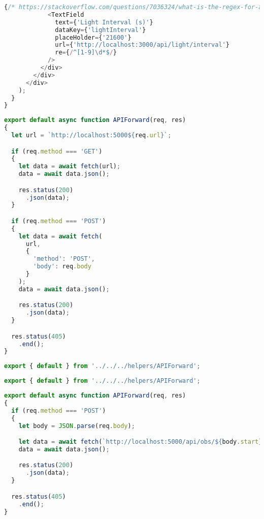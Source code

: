 \begin{lstlisting}[title={index.js}, language=JavaScript]
            {/* https://stackoverflow.com/questions/7036324/what-is-the-regex-for-any-positive-integer-excluding-0 */}
            <TextField
              text={'Light Interval (s)'}
              dataKey={'lightInterval'}
              placeHolder={'21600'}
              url={'http://localhost:3000/api/light/interval'}
              re={/^[1-9]\d*$/}
            />
          </div>
        </div>
      </div>
    );
  }
}
\end{lstlisting}

\bigskip

\begin{lstlisting}[title={APIForward.js}, language=JavaScript]
export default async function APIForward(req, res)
{
  let url = `http://localhost:5000${req.url}`;

  if (req.method === 'GET')
  {
    let data = await fetch(url);
    data = await data.json();

    res.status(200)
      .json(data);
  }

  if (req.method === 'POST')
  {
    let data = await fetch(
      url,
      {
        'method': 'POST',
        'body': req.body
      }
    );
    data = await data.json();

    res.status(200)
      .json(data);
  }

  res.status(405)
    .end();
}

\end{lstlisting}

\bigskip

\begin{lstlisting}[title={interval.js}, language=JavaScript]
export { default } from '../../../helpers/APIForward';
\end{lstlisting}

\bigskip

\begin{lstlisting}[title={schedule.js}, language=JavaScript]
export { default } from '../../../helpers/APIForward';
\end{lstlisting}

\bigskip

\begin{lstlisting}[title={getRange.js}, language=JavaScript]
export default async function APIForward(req, res)
{
  if (req.method === 'POST')
  {
    let body = JSON.parse(req.body);

    let data = await fetch(`http://localhost:5000/api/obs/${body.start}/${body.end}`);
    data = await data.json();

    res.status(200)
      .json(data);
  }

  res.status(405)
    .end();
}
\end{lstlisting}

